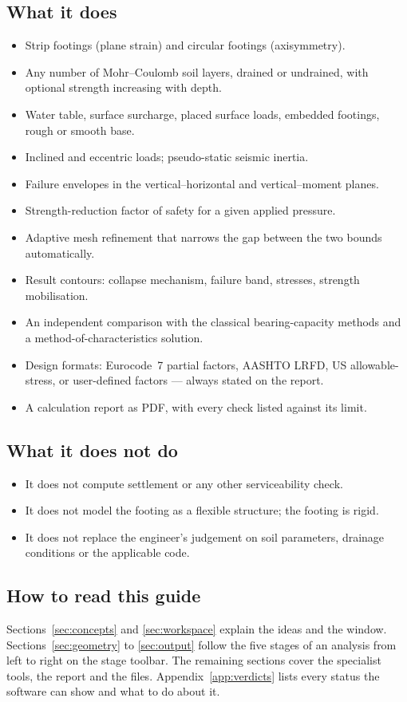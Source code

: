 \documentclass[11pt,a4paper]{article}
\begin{document}
\subsection{What it does}
\begin{itemize}
  \item Strip footings (plane strain) and circular footings (axisymmetry).
  \item Any number of Mohr--Coulomb soil layers, drained or undrained, with optional strength increasing with depth.
  \item Water table, surface surcharge, placed surface loads, embedded footings, rough or smooth base.
  \item Inclined and eccentric loads; pseudo-static seismic inertia.
  \item Failure envelopes in the vertical--horizontal and vertical--moment planes.
  \item Strength-reduction factor of safety for a given applied pressure.
  \item Adaptive mesh refinement that narrows the gap between the two bounds automatically.
  \item Result contours: collapse mechanism, failure band, stresses, strength mobilisation.
  \item An independent comparison with the classical bearing-capacity methods and a method-of-characteristics solution.
  \item Design formats: Eurocode~7 partial factors, AASHTO LRFD, US allowable-stress, or user-defined factors --- always stated on the report.
  \item A calculation report as PDF, with every check listed against its limit.
\end{itemize}

\subsection{What it does not do}
\begin{itemize}
  \item It does not compute settlement or any other serviceability check.
  \item It does not model the footing as a flexible structure; the footing is rigid.
  \item It does not replace the engineer's judgement on soil parameters, drainage conditions or the applicable code.
\end{itemize}

\subsection{How to read this guide}
Sections~\ref{sec:concepts} and \ref{sec:workspace} explain the ideas and the window. Sections~\ref{sec:geometry} to \ref{sec:output} follow the five stages of an analysis from left to right on the stage toolbar. The remaining sections cover the specialist tools, the report and the files. Appendix~\ref{app:verdicts} lists every status the software can show and what to do about it.
\end{document}
